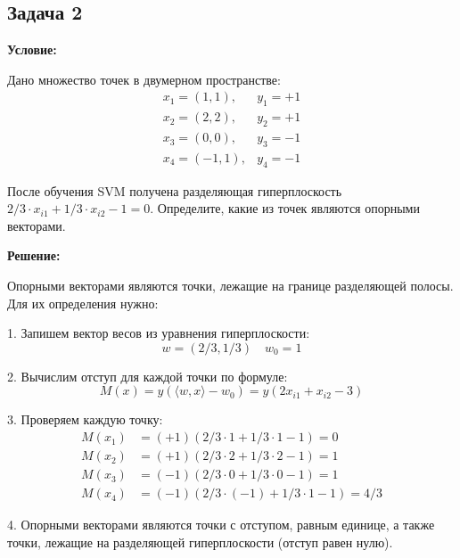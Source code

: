\subsection{Задача 2}
\textbf{Условие:}
\par Дано множество точек в двумерном пространстве:
\begin{equation*}
    \begin{array}{ll}
        x_1 = (1,1),  & y_1 = +1 \\
        x_2 = (2,2),  & y_2 = +1 \\
        x_3 = (0,0),  & y_3 = -1 \\
        x_4 = (-1,1), & y_4 = -1
    \end{array}
\end{equation*}
\par После обучения SVM получена разделяющая гиперплоскость \(2/3 \cdot x_{i1} + 1/3 \cdot x_{i2} - 1 = 0\). Определите, какие из точек являются опорными векторами.

\textbf{Решение:}
\par Опорными векторами являются точки, лежащие на границе разделяющей полосы. Для их определения нужно:

\par 1. Запишем вектор весов из уравнения гиперплоскости:
\begin{equation*}
    w = (2/3,1/3) \quad w_0 = 1
\end{equation*}

\par 2. Вычислим отступ для каждой точки по формуле:
\begin{equation*}
    M(x) = y(\langle w,x \rangle - w_0) = y(2x_{i1} + x_{i2} - 3)
\end{equation*}

\par 3. Проверяем каждую точку:
\begin{align*}
    M(x_1) & = (+1)(2/3 \cdot 1 + 1/3 \cdot 1 - 1) = 0      \\
    M(x_2) & = (+1)(2/3 \cdot 2 + 1/3 \cdot 2 - 1) = 1      \\
    M(x_3) & = (-1)(2/3 \cdot 0 + 1/3 \cdot 0 - 1) = 1      \\
    M(x_4) & = (-1)(2/3 \cdot (-1) + 1/3 \cdot 1 - 1) = 4/3
\end{align*}

\par 4. Опорными векторами являются точки с отступом, равным единице, а также точки, лежащие на разделяющей гиперплоскости (отступ равен нулю).

